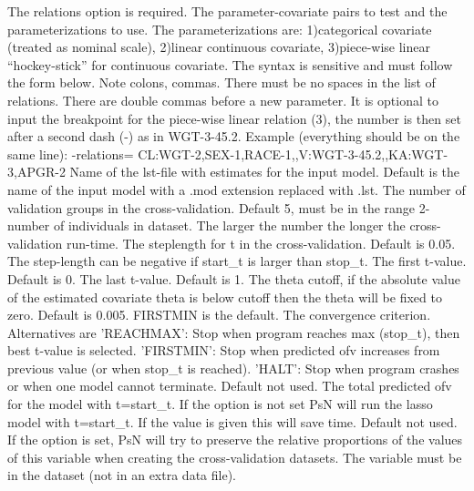 \begin{optionlist}
The relations option is required. The parameter-covariate pairs to test and the parameterizations to use. The parameterizations are: 1)categorical covariate (treated as nominal scale), 2)linear continuous covariate, 3)piece-wise linear “hockey-stick” for continuous covariate. The syntax is sensitive and must follow the form below. Note colons, commas. There must be no spaces in the list of relations. There are double commas before a new parameter. It is optional to input the breakpoint for the piece-wise linear relation (3), the number is then set after a second dash (-) as in WGT-3-45.2. Example (everything should be on the same line):		-relations= CL:WGT-2,SEX-1,RACE-1,,V:WGT-3-45.2,,KA:WGT-3,APGR-2 
\nextopt
{}
Name of the lst-file with estimates for the input model. Default is the name of the input model with a .mod extension	replaced with .lst. 
\nextopt
{}
The number of validation groups in the cross-validation. Default 5, must be in the range 2-number of individuals in dataset. The larger the number the longer the cross-validation run-time. 
\nextopt
{}
The steplength for t in the cross-validation. Default is 0.05. The step-length can be negative if start\_t is larger than stop\_t. 
\nextopt
{}
The first t-value. Default is 0. 
\nextopt
{}
The last t-value. Default is 1. 
\nextopt
{}
The theta cutoff, if the absolute value of the estimated covariate theta is below cutoff then the theta will be fixed to zero. Default is 0.005. 
\nextopt
{}
FIRSTMIN is the default. The convergence criterion. Alternatives are 'REACHMAX': Stop when program reaches max (stop\_t), then best t-value is selected. 'FIRSTMIN': Stop when predicted ofv increases from previous value (or when stop\_t is reached). 'HALT': Stop when program crashes or when one model cannot terminate. 
\nextopt
{}
Default not used. The total predicted ofv for the model with t=start\_t.  If the option is not set PsN will run the lasso model with t=start\_t. If the value is given this will save time. 
\nextopt
{}
Default not used. If the option is set, PsN will try to preserve the relative proportions of the values of this variable when creating the cross-validation datasets. The variable must be in the dataset (not in an extra data file). 
\nextopt
\end{optionlist}

